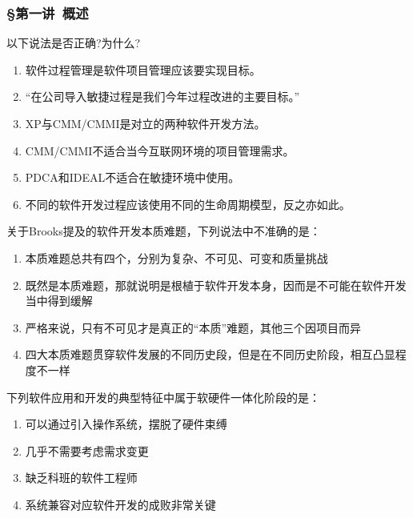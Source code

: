 \subsubsection*{\S 第一讲\ 概述}
\setcounter{problemname}{0}

\begin{problem}
以下说法是否正确?为什么?
\begin{enumerate}[label=\arabic*.]
    \item 软件过程管理是软件项目管理应该要实现目标。
    \item “在公司导入敏捷过程是我们今年过程改进的主要目标。”
    \item XP与CMM/CMMI是对立的两种软件开发方法。
    \item CMM/CMMI不适合当今互联网环境的项目管理需求。
    \item PDCA和IDEAL不适合在敏捷环境中使用。
    \item 不同的软件开发过程应该使用不同的生命周期模型，反之亦如此。
\end{enumerate}
\end{problem}


\begin{problem}
	关于Brooks提及的软件开发本质难题，下列说法中不准确的是：
        \begin{enumerate}[label=\Alph*.]
            \item 本质难题总共有四个，分别为复杂、不可见、可变和质量挑战
            \item 既然是本质难题，那就说明是根植于软件开发本身，因而是不可能在软件开发当中得到缓解
            \item 严格来说，只有不可见才是真正的“本质”难题，其他三个因项目而异
            \item 四大本质难题贯穿软件发展的不同历史段，但是在不同历史阶段，相互凸显程度不一样
        \end{enumerate}
\end{problem}




\begin{problem}
	下列软件应用和开发的典型特征中属于软硬件一体化阶段的是：
    \vspace{-0.8em}
    \begin{multicols}{2}
        \begin{enumerate}[label=\Alph*.]
            \item 可以通过引入操作系统，摆脱了硬件束缚
            \item 几乎不需要考虑需求变更
            \item 缺乏科班的软件工程师
            \item 系统兼容对应软件开发的成败非常关键
        \end{enumerate}
    \end{multicols}
    \vspace{-1em}
\end{problem}





